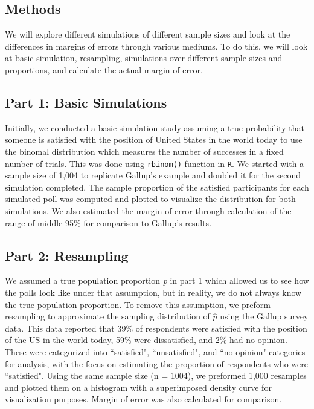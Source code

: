 \documentclass{article}\usepackage[]{graphicx}\usepackage[]{xcolor}
\begin{document}
\begin{multicols}{2}
\section{Methods}
We will explore different simulations of different sample sizes and look at the differences in margins of errors through various mediums. To do this, we will look at basic simulation, resampling, simulations over different sample sizes and proportions, and calculate the actual margin of error. 

\subsection{Part 1: Basic Simulations}
Initially, we conducted a basic simulation study assuming a true probability that someone is satisfied with the position of United States in the world today to use the binomal distribution which measures the number of successes in a fixed number of trials. This was done using \texttt{rbinom()} function in \texttt{R}. We started with a sample size of 1,004 to replicate Gallup's example and doubled it for the second simulation completed. The sample proportion of the satisfied participants for each simulated poll was computed and plotted to visualize the distribution for both simulations. We also estimated the margin of error through calculation of the range of middle 95\% for comparison to Gallup's results. 

\subsection{Part 2: Resampling}

We assumed a true population proportion \emph{p} in part 1 which allowed us to see how the polls look like under that assumption, but in reality, we do not always know the true population proportion. To remove this assumption, we preform resampling to approximate the sampling distribution of \(\hat{p}\) using the Gallup survey data. This data reported that 39\% of respondents were satisfied with the position of the US in the world today, 59\% were dissatisfied, and 2\% had no opinion. These were categorized into ``satisfied", ``unsatisfied", and ``no opinion" categories for analysis, with the focus on estimating the proportion of respondents who were ``satisfied". Using the same sample size (n = 1004), we preformed 1,000 resamples and plotted them on a histogram with a superimposed density curve for visualization purposes. Margin of error was also calculated for comparison. 


\end{multicols}
\end{document}
